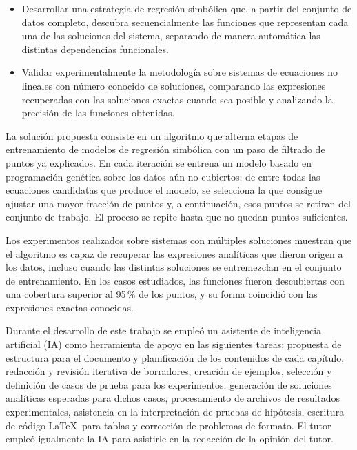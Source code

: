 \begin{introduction}
\begin{itemize}
	\item Desarrollar una estrategia de regresión simbólica que, a partir del conjunto de datos completo, descubra secuencialmente las funciones que representan cada una de las soluciones del sistema, separando de manera automática las distintas dependencias funcionales.

	\item Validar experimentalmente la metodología sobre sistemas de ecuaciones no lineales con número conocido de soluciones, comparando las expresiones recuperadas con las soluciones exactas cuando sea posible y analizando la precisión de las funciones obtenidas.
\end{itemize}

La solución propuesta consiste en un algoritmo que alterna etapas de entrenamiento de modelos de regresión simbólica con un paso de filtrado de puntos ya explicados. En cada iteración se entrena un modelo basado en programación genética sobre los datos aún no cubiertos; de entre todas las ecuaciones candidatas que produce el modelo, se selecciona la que consigue ajustar una mayor fracción de puntos y, a continuación, esos puntos se retiran del conjunto de trabajo. El proceso se repite hasta que no quedan puntos suficientes.

Los experimentos realizados sobre sistemas con múltiples soluciones muestran que el algoritmo es capaz de recuperar las expresiones analíticas que dieron origen a los datos, incluso cuando las distintas soluciones se entremezclan en el conjunto de entrenamiento. En los casos estudiados, las funciones fueron descubiertas con una cobertura superior al 95\,\% de los puntos, y su forma coincidió con las expresiones exactas conocidas.

Durante el desarrollo de este trabajo se empleó un asistente de inteligencia artificial (IA) como herramienta de apoyo en las siguientes tareas: propuesta de estructura para el documento y planificación de los contenidos de cada capítulo, redacción y revisión iterativa de borradores, creación de ejemplos, selección y definición de casos de prueba para los experimentos, generación de soluciones analíticas esperadas para dichos casos, procesamiento de archivos de resultados experimentales, asistencia en la interpretación de pruebas de hipótesis, escritura de código \LaTeX\ para tablas y corrección de problemas de formato. El tutor empleó igualmente la IA para asistirle en la redacción de la opinión del tutor.


\end{introduction}
